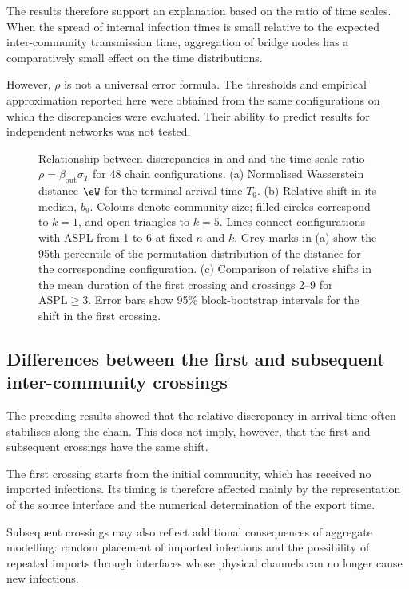 The results therefore support an explanation based on the ratio of time scales. When the spread of internal infection times is small relative to the expected inter-community transmission time, aggregation of bridge nodes has a comparatively small effect on the time distributions.

However, $\rho$ is not a universal error formula. The thresholds and empirical approximation reported here were obtained from the same configurations on which the discrepancies were evaluated. Their ability to predict results for independent networks was not tested.

\begin{figure}[tbp]
\centering
\caption{%
Relationship between discrepancies in \Full{} and \TS{} and the time-scale ratio $\rho=\beta_{\mathrm{out}}\sigma_T$ for 48 chain configurations.
(a) Normalised Wasserstein distance $\eW$ for the terminal arrival time $T_9$.
(b) Relative shift in its median, $b_9$.
Colours denote community size; filled circles correspond to $k=1$, and open triangles to $k=5$.
Lines connect configurations with ASPL from 1 to 6 at fixed $n$ and $k$. Grey marks in (a) show the 95th percentile of the permutation distribution of the distance for the corresponding configuration.
(c) Comparison of relative shifts in the mean duration of the first crossing and crossings 2--9 for $\mathrm{ASPL}\geq3$.
Error bars show 95\% block-bootstrap intervals for the shift in the first crossing.
}
\label{fig:descriptor}
\end{figure}


\subsection{Differences between the first and subsequent inter-community crossings}

The preceding results showed that the relative discrepancy in arrival time often stabilises along the chain. This does not imply, however, that the first and subsequent crossings have the same shift.

The first crossing starts from the initial community, which has received no imported infections. Its timing is therefore affected mainly by the representation of the source interface and the numerical determination of the export time.

Subsequent crossings may also reflect additional consequences of aggregate modelling: random placement of imported infections and the possibility of repeated imports through interfaces whose physical channels can no longer cause new infections.

